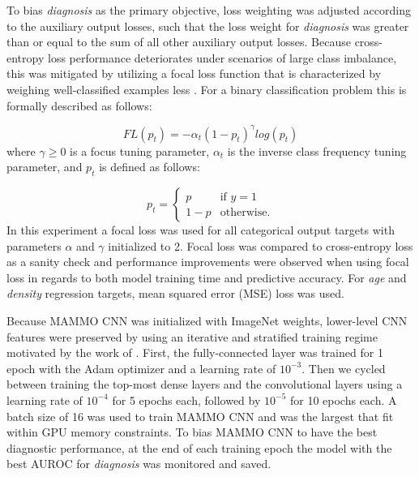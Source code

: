 \documentclass[journal]{IEEEtran}
\begin{document}
To bias \textit{diagnosis} as the primary objective, loss weighting was adjusted according to the auxiliary output losses, such that the loss weight for \textit{diagnosis} was greater than or equal to the sum of all other auxiliary output losses.  Because cross-entropy loss performance deteriorates under scenarios of large class imbalance, this was mitigated by utilizing a focal loss function that is characterized by weighing well-classified examples less \cite{focalloss-2017}.  For a binary classification problem this is formally described as follows: 

\begin{equation} \label{eq:focal_loss}
{FL}(p_t) = -\alpha_t(1-p_t)^\gamma log(p_t)
\end{equation}
where $\gamma \geq 0$ is a focus tuning parameter, $\alpha_t$ is the inverse class frequency tuning parameter, and $p_t$ is defined as follows: 

\begin{equation} \label{eq:pt}
p_t = \begin{cases}
p &\text{if $y=1$}
\\
1-p &\text{otherwise.}
\end{cases}
\end{equation}
In this experiment a focal loss was used for all categorical output targets with parameters $\alpha$ and $\gamma$ initialized to 2. 
Focal loss was compared to cross-entropy loss as a sanity check and performance improvements were observed when using focal loss in regards to both model training time and predictive accuracy.  For  \textit{age} and \textit{density} regression targets, mean squared error (MSE) loss was used.  

Because MAMMO CNN was initialized with ImageNet weights, lower-level CNN features were preserved by using an iterative and stratified training regime motivated by the work of \cite{shen-2017}.  First, the fully-connected layer was trained for 1 epoch with the Adam optimizer and a learning rate of $10^{-3}$.  
Then we cycled between training the top-most dense layers and the convolutional layers using a learning rate of $10^{-4}$ for 5 epochs each, followed by $10^{-5}$ for 10 epochs each.
A batch size of 16 was used to train MAMMO CNN and was the largest that fit within GPU memory constraints.  To bias MAMMO CNN to have the best diagnostic performance, at the end of each training epoch the model with the best AUROC for \textit{diagnosis} was monitored  and saved.
\end{document}
